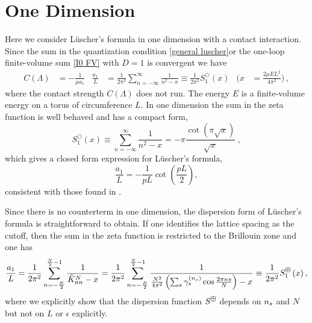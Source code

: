 \section{One Dimension}\label{sec:1D}

Here we consider L\"uscher's formula in one dimension with a contact interaction.
Since the sum in the quantization condition \eqref{general luscher}or the one-loop finite-volume sum \eqref{I0 FV} with $D=1$ is convergent we have %
\begin{align}\label{eq:tuning-1d}
    C(\Lambda)
    &=
            -\frac{1}{\mu a_{1}}
    &
    \frac{a_{1}}{L}
        &=
            \frac{1}{2 \pi^{2}}
            \sum_{n=-\infty}^{\infty} \frac{1}{n^{2}-x}
        \equiv
            \frac{1}{2 \pi^{2}}
            S^\bigcirc_{1}\left(x\right)
    &
    \Bigg(x
        &=
            \frac{2\mu E L^2}{4\pi^2}\Bigg)
    \, ,
\end{align}
where the contact strength $C(\Lambda)$ does not run.
The energy $E$ is a finite-volume energy on a torus of circumference $L$.
In one dimension the sum in the zeta function is well behaved and has a compact form,
\begin{equation}\label{eq:1d luscher}
S^\bigcirc_{1}(x) \equiv \sum_{n=-\infty}^{\infty} \frac{1}{n^{2}-x}=-\pi \frac{\cot (\pi \sqrt{x})}{\sqrt{x}}\ ,
\end{equation}
which gives a closed form expression for L\"uscher's formula,
\begin{equation}\label{eq:1d luscher constant}
\frac{a_{1}}{L} =-\frac{1}{pL}\cot\left(\frac{pL}{2}\right),
\end{equation}
consistent with those found in \cite{Luscher:1990ck,Zhu:2019dho}.

Since there is no counterterm in one dimension, the dispersion form of L\"uscher's formula is straightforward to obtain.  If one identifies the lattice spacing as the cutoff, then the sum in the zeta function is restricted to the Brillouin zone and one has
\begin{equation}
    \frac{a_{1}}{L}
    =
    \frac{1}{2 \pi^{2}} \sum_{n=-\frac{N}{2}}^{\frac{N}{2}-1} \frac{1}{\tilde{K}^N_{nn}-x}
    =
    \frac{1}{2 \pi^{2}} \sum_{n=-\frac{N}{2}}^{\frac{N}{2}-1} \frac{1}{\frac{N^2}{4\pi^2}\left(\sum_{s}\gamma_s^{({n_s})}\cos\frac{2\pi n s}{N}\right)-x}
    \equiv
    \frac{1}{2 \pi^{2}} S^{\boxplus}_{1}\left(x\right),\label{eq:1d dispersion luscher}
\end{equation}
where we explicitly show that the dispersion function $S^{\boxplus}$ depends on ${n_s}$ and $N$ but not on $L$ or $\epsilon$ explicitly.

